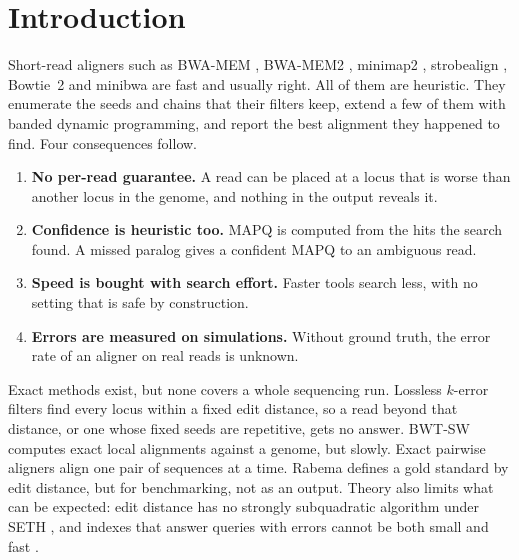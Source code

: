 \documentclass[11pt]{article}
\theoremstyle{definition}
\begin{document}
\section{Introduction}

Short-read aligners such as BWA-MEM \citep{li2013bwamem}, BWA-MEM2
\citep{vasimuddin2019bwamem2}, minimap2 \citep{li2018minimap2},
strobealign \citep{sahlin2022strobealign}, Bowtie~2
\citep{langmead2012bowtie2} and minibwa \citep{li2026minibwa} are
fast and usually right. All of them are heuristic. They enumerate the
seeds and chains that their filters keep, extend a few of them with banded
dynamic programming, and report the best alignment they happened to find.
Four consequences follow.
\begin{enumerate}[label=W\arabic*.]
\item \textbf{No per-read guarantee.} A read can be placed at a locus
  that is worse than another locus in the genome, and nothing in the
  output reveals it.
\item \textbf{Confidence is heuristic too.} MAPQ is computed from the
  hits the search found. A missed paralog gives a confident MAPQ to an
  ambiguous read.
\item \textbf{Speed is bought with search effort.} Faster tools search
  less, with no setting that is safe by construction.
\item \textbf{Errors are measured on simulations.} Without ground truth,
  the error rate of an aligner on real reads is unknown.
\end{enumerate}

Exact methods exist, but none covers a whole sequencing run. Lossless
$k$-error filters \citep{weese2012razers3,marcosola2012gem,kucherov2016search,kianfar2017optimum}
find every locus within a fixed edit distance, so a read beyond that
distance, or one whose fixed seeds are repetitive, gets no answer. BWT-SW
\citep{lam2008bwtsw} computes exact local alignments against a genome, but
slowly. Exact pairwise aligners \citep{marcosola2021wfa,grootkoerkamp2024astarpa,grootkoerkamp2024astarpa2,sosic2017edlib}
align one pair of sequences at a time. Rabema \citep{holtgrewe2011rabema}
defines a gold standard by edit distance, but for benchmarking, not as an
output. Theory also limits what can be expected: edit distance has no
strongly subquadratic algorithm under SETH \citep{backurs2015edit}, and
indexes that answer queries with errors cannot be both small and fast
\citep{cohenaddad2019lower}.
\end{document}
